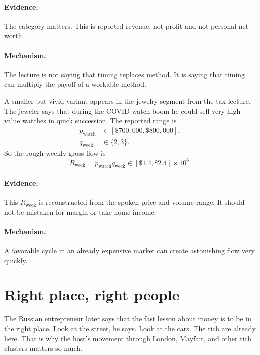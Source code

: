\documentclass[11pt,oneside]{book}
\begin{document}
\paragraph{Evidence.} The category matters. This is reported revenue, not profit and not personal net worth.

\paragraph{Mechanism.} The lecture is not saying that timing replaces method. It is saying that timing can multiply the payoff of a workable method.

A smaller but vivid variant appears in the jewelry segment from the tax lecture. The jeweler says that during the COVID watch boom he could sell very high-value watches in quick succession. The reported range is
\begin{align}
p_{\mathrm{watch}} &\in [\$700{,}000,\$800{,}000],\\
q_{\mathrm{week}} &\in \{2,3\}.
\end{align}
So the rough weekly gross flow is
\begin{equation}
R_{\mathrm{week}} = p_{\mathrm{watch}}q_{\mathrm{week}}
\in [\$1.4,\$2.4]\times 10^{6}.
\end{equation}

\paragraph{Evidence.} This \(R_{\mathrm{week}}\) is reconstructed from the spoken price and volume range. It should not be mistaken for margin or take-home income.

\paragraph{Mechanism.} A favorable cycle in an already expensive market can create astonishing flow very quickly.

\section{Right place, right people}

The Russian entrepreneur later says that the fast lesson about money is to be in the right place. Look at the street, he says. Look at the cars. The rich are already here. That is why the host's movement through London, Mayfair, and other rich clusters matters so much.
\end{document}
